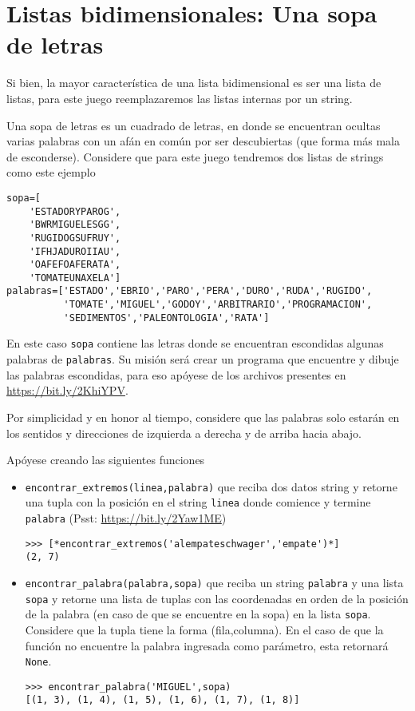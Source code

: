 \section{Listas bidimensionales: Una sopa de letras}

Si bien, la mayor característica de una lista bidimensional es ser una lista de listas, para este juego reemplazaremos las listas internas por un string.

Una sopa de letras es un cuadrado de letras, en donde se encuentran ocultas varias palabras con un afán en común por ser descubiertas (que forma más mala de esconderse). Considere que para este juego tendremos dos listas de strings como este ejemplo
\newpage
\begin{lstlisting}[style=consola]
sopa=[
    'ESTADORYPAROG',
    'BWRMIGUELESGG',
    'RUGIDOGSUFRUY',
    'IFHJADUROIIAU',
    'OAFEFOAFERATA',
    'TOMATEUNAXELA']
palabras=['ESTADO','EBRIO','PARO','PERA','DURO','RUDA','RUGIDO',
          'TOMATE','MIGUEL','GODOY','ARBITRARIO','PROGRAMACION',
          'SEDIMENTOS','PALEONTOLOGIA','RATA']
\end{lstlisting}

En este caso \texttt{sopa} contiene las letras donde se encuentran escondidas algunas palabras de \texttt{palabras}. Su misión será crear un programa que encuentre y dibuje las palabras escondidas, para eso apóyese de los archivos presentes en \url{https://bit.ly/2KhiYPV}.

Por simplicidad y en honor al tiempo, considere que las palabras solo estarán en los sentidos y direcciones de izquierda a derecha y de arriba hacia abajo.

Apóyese creando las siguientes funciones
\begin{itemize}
    \item \texttt{encontrar\_extremos(linea,palabra)} que reciba dos datos string y retorne una tupla con la posición en el string \texttt{linea} donde comience y termine \texttt{palabra} (Psst: \url{https://bit.ly/2Yaw1ME})
\begin{lstlisting}[style=consola]
>>> [*encontrar_extremos('alempateschwager','empate')*]
(2, 7)
\end{lstlisting}
    \item \texttt{encontrar\_palabra(palabra,sopa)} que reciba un string \texttt{palabra} y una lista \texttt{sopa} y retorne una lista de tuplas con las coordenadas en orden de la posición de la palabra (en caso de que se encuentre en la sopa) en la lista \texttt{sopa}. Considere que la tupla tiene la forma (fila,columna). En el caso de que la función no encuentre la palabra ingresada como parámetro, esta retornará \texttt{None}.
\begin{lstlisting}[style=consola]
>>> encontrar_palabra('MIGUEL',sopa)
[(1, 3), (1, 4), (1, 5), (1, 6), (1, 7), (1, 8)]
\end{lstlisting}
\end{itemize}

